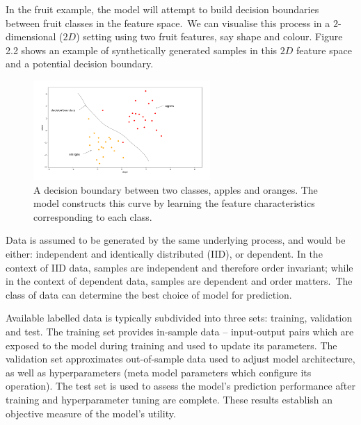 \noindent In the fruit example, the model will attempt to build decision boundaries between fruit classes in the feature space.\ We can visualise this process in a $2$-dimensional ($ 2D $) setting using two fruit features, say shape and colour. Figure 2.2 shows an example of synthetically generated samples in this $ 2D $ feature space and a potential decision boundary.

\begin{figure}[H]
   	\centering
    	\includegraphics[width=0.6\textwidth, height=0.4\textwidth]{oranges_and_apples_decision_boundary}
	\captionsetup{justification=centering}
	\caption{A decision boundary between two classes, apples and oranges. The model constructs this curve by learning the feature characteristics corresponding to each class.}
\end{figure}

\noindent Data is assumed to be generated by the same underlying process, and would be either: independent and identically distributed (IID), or dependent. In the context of IID data, samples are independent and therefore order invariant; while in the context of dependent data, samples are dependent and order matters.\ The class of data can determine the best choice of model for prediction. \par

\noindent Available labelled data is typically subdivided into three sets: training, validation and test. The training set provides in-sample data -- input-output pairs which are exposed to the model during training and used to update its parameters. The validation set approximates out-of-sample data used to adjust model architecture, as well as hyperparameters (meta model parameters which configure its operation). The test set is used to assess the model's prediction performance after training and hyperparameter tuning are complete. These results establish an objective measure of the model's utility.  \par

